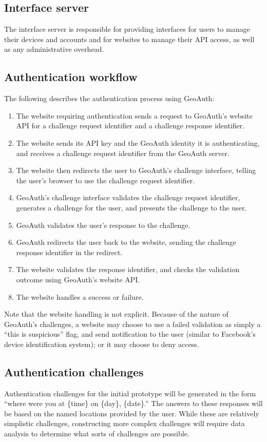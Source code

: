 \documentclass[11pt]{article} %
\begin{document}
\subsection{Interface server}
The interface server is responsible for providing interfaces for users to manage their devices and accounts and for websites to manage their API access, as well as any administrative overhead.

\subsection{Authentication workflow}
The following describes the authentication process using GeoAuth:

\begin{enumerate}
\item The website requiring authentication sends a request to GeoAuth's website API for a challenge request identifier and a challenge response identifier.
\item The website sends its API key and the GeoAuth identity it is authenticating, and receives a challenge request identifier from the GeoAuth server.
\item The website then redirects the user to GeoAuth's challenge interface, telling the user's browser to use the challenge request identifier.
\item GeoAuth's challenge interface validates the challenge request identifier, generates a challenge for the user, and presents the challenge to the user.
\item GeoAuth validates the user's response to the challenge.
\item GeoAuth redirects the user back to the website, sending the challenge response identifier in the redirect.
\item The website validates the response identifier, and checks the validation outcome using GeoAuth's website API.
\item The website handles a success or failure.
\end{enumerate}

Note that the website handling is not explicit. Because of the nature of GeoAuth's challenges, a website may choose to use a failed validation as simply a ``this is suspicious'' flag, and send notification to the user (similar to Facebook's device identification system); or it may choose to deny access.

\subsection{Authentication challenges}
Authentication challenges for the initial prototype will be generated in the form ``where were you at \{time\} on \{day\}, \{date\}.'' The answers to these responses will be based on the named locations provided by the user. While these are relatively simplistic challenges, constructing more complex challenges will require data analysis to determine what sorts of challenges are possible.
\end{document}
